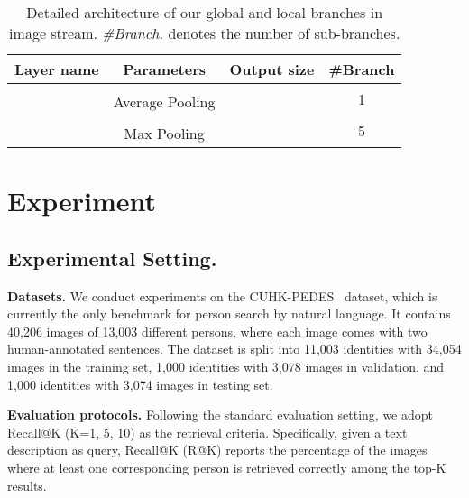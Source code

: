 \documentclass[runningheads]{llncs}
\begin{document}
\begin{table}[t]
\caption{Detailed architecture of our global and local branches in image stream. \emph{\#Branch.} denotes the number of sub-branches.}
\begin{center}
\setlength{\tabcolsep}{7.5pt}
\begin{tabular}{c|c|c|c}
\toprule[1pt]
\multicolumn{1}{c|}{Layer name} & \multicolumn{1}{c|}{Parameters} & \multicolumn{1}{c|}{Output size} & \#Branch \\
\hline
 \multicolumn{1}{c|}{\multirow{3}[4]{*}{}} & \multicolumn{1}{c|}{\multirow{2}[2]{*}{}} & \multicolumn{1}{c|}{\multirow{2}[2]{*}{}} & \multicolumn{1}{c}{\multirow{3}[4]{*}{1}} \bigstrut\\
\multicolumn{1}{c|}{} & \multicolumn{1}{c|}{} & \multicolumn{1}{c|}{} & \multicolumn{1}{c}{} \\
\cline{2-3}
\multicolumn{1}{c|}{} & Average Pooling &  & \bigstrut \\
\hline
 \multicolumn{1}{c|}{\multirow{3}[4]{*}{}} & \multicolumn{1}{c|}{\multirow{2}[2]{*}{}} & \multicolumn{1}{c|}{\multirow{2}[2]{*}{}} & \multicolumn{1}{c}{\multirow{3}[4]{*}{5}} \bigstrut\\
\multicolumn{1}{c|}{} & \multicolumn{1}{c|}{} & \multicolumn{1}{c|}{} & \multicolumn{1}{c}{} \\
\cline{2-3}
\multicolumn{1}{c|}{} & Max Pooling &  & \bigstrut\\
\bottomrule[1pt]
\end{tabular}
\end{center}
\label{tab:head}
\end{table}

\section{Experiment}
\subsection{Experimental Setting.}
\noindent\textbf{Datasets.} We conduct experiments on the CUHK-PEDES~\cite{li2017person} dataset, which is currently the only benchmark for person search by natural language. It contains 40,206 images of 13,003 different persons, where each image comes with two human-annotated sentences. The dataset is split into 11,003 identities with 34,054 images in the training set, 1,000 identities with 3,078 images in validation, and 1,000 identities with 3,074 images in testing set.

\noindent\textbf{Evaluation protocols.} Following the standard evaluation setting, we adopt Recall@K (K=1, 5, 10) as the retrieval criteria. Specifically, given a text description as query, Recall@K (R@K) reports the percentage of the images where at least one corresponding person is retrieved correctly among the top-K results.
\end{document}
